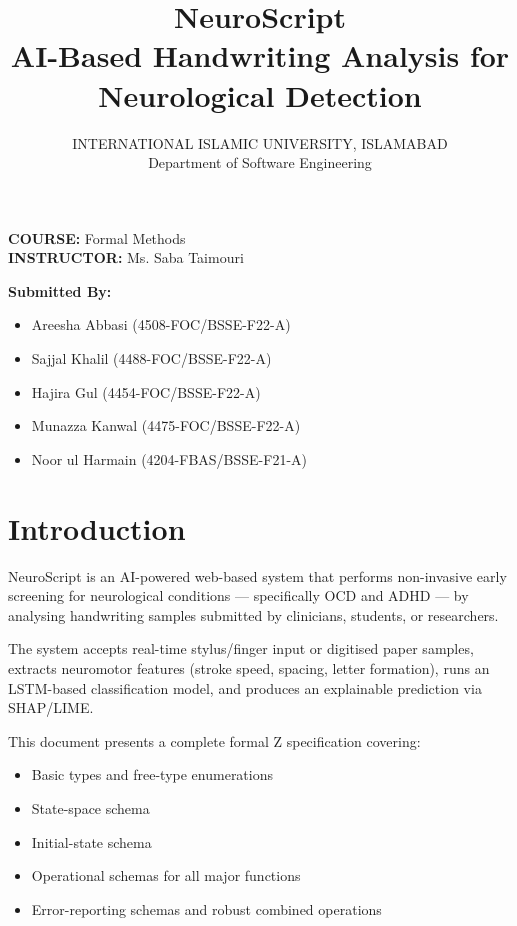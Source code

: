 \documentclass[12pt,a4paper]{article}
\title{
\textbf{NeuroScript}\\
AI-Based Handwriting Analysis for Neurological Detection
}
\author{
INTERNATIONAL ISLAMIC UNIVERSITY, ISLAMABAD\\
Department of Software Engineering
}
\date{}
\begin{document}
\maketitle

\begin{center}
\textbf{COURSE:} Formal Methods\\
\textbf{INSTRUCTOR:} Ms. Saba Taimouri
\end{center}

\vspace{1cm}

\textbf{Submitted By:}
\begin{itemize}
    \item Areesha Abbasi (4508-FOC/BSSE-F22-A)
    \item Sajjal Khalil (4488-FOC/BSSE-F22-A)
    \item Hajira Gul (4454-FOC/BSSE-F22-A)
    \item Munazza Kanwal (4475-FOC/BSSE-F22-A)
    \item Noor ul Harmain (4204-FBAS/BSSE-F21-A)
\end{itemize}

\newpage

\tableofcontents

\newpage

\section{Introduction}

NeuroScript is an AI-powered web-based system that performs non-invasive early screening for neurological conditions — specifically OCD and ADHD — by analysing handwriting samples submitted by clinicians, students, or researchers.

The system accepts real-time stylus/finger input or digitised paper samples, extracts neuromotor features (stroke speed, spacing, letter formation), runs an LSTM-based classification model, and produces an explainable prediction via SHAP/LIME.

This document presents a complete formal Z specification covering:

\begin{itemize}
    \item Basic types and free-type enumerations
    \item State-space schema
    \item Initial-state schema
    \item Operational schemas for all major functions
    \item Error-reporting schemas and robust combined operations
\end{itemize}
\end{document}
